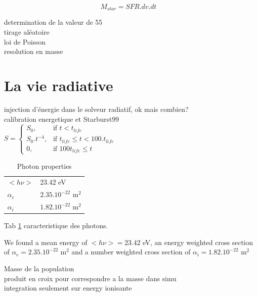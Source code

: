 \begin{equation}
	M_{star} = SFR . dv .dt 
\end{equation}

determination de la valeur de 55\\

tirage aléatoire\\
loi de Poisson\\

resolution en masse\\



\section{La vie radiative}

injection d'énergie dans le solveur radiatif, ok mais combien?\\
calibration energetique et Starburst99\\


$
    S = 
\begin{cases}
    S_0 ,         & \text{if } t < t_{life}\\
    S_0.t^{-4},   & \text{if } t_{life} \leq t < 100.t_{life} \\
    0,   & \text{if } 100t_{life} \leq t
\end{cases}
$


\begin{table}
\begin{tabular}{|l|l|}
  \hline
	$<h\nu>$	&  23.42 eV \\
	$\alpha_e$	&  $2.35.10^{-22}$ m$^2$ \\
	$\alpha_i$	&  $1.82.10^{-22}$ m$^2$ \\
  \hline
\end{tabular}
\caption{Photon properties
\label{tab_photon}}
\end{table}

Tab \ref{tab_photon} caracteristique des photons.




We found a mean energy of $<h\nu> = 23.42$ eV,
an energy weighted cross section of
$\alpha_e = 2.35.10^{-22}$ m$^2$
and a number weighted cross section of
$\alpha_i = 1.82.10^{-22}$ m$^2$



Masse de la population\\
produit en croix pour correspondre a la masse dans simu\\
integration seulement sur energy ionisante\\

